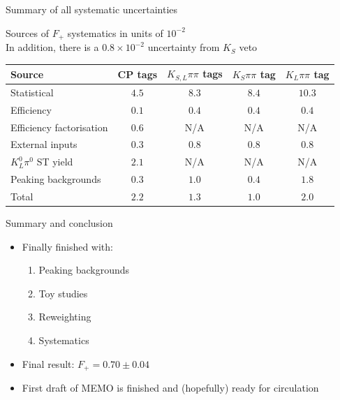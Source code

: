 \documentclass{beamer}
\begin{document}
\begin{frame}{Summary of all systematic uncertainties}
  \vspace{-0.3cm}
  \begin{center}
    Sources of $F_+$ systematics in units of $10^{-2}$ \\
    In addition, there is a $0.8\times 10^{-2}$ uncertainty from $K_S$ veto
  \end{center}
  \vspace{0.02cm}
  \begin{tabular}{lcccc} 
        \hline
        Source                   & CP tags                  & $K_{S, L}\pi\pi$ tags    & $K_S\pi\pi$ tag          & $K_L\pi\pi$ tag          \\
        \hline
        Statistical              & $4.5$                    & $8.3$                    & $8.4$                    & $10.3$                   \\
        \hline
        Efficiency               & $0.1$                    & $0.4$                    & $0.4$                    & $0.4$                    \\
        Efficiency factorisation & $0.6$                    & N/A                      & N/A                      & N/A                      \\
        External inputs          & $0.3$                    & $0.8$                    & $0.8$                    & $0.8$                    \\
        $K^0_L\pi^0$ ST yield    & $2.1$                    & N/A                      & N/A                      & N/A                      \\
        Peaking backgrounds      & $0.3$                    & $1.0$                    & $0.4$                    & $1.8$                    \\
        \hline
        Total                    & $2.2$                    & $1.3$                    & $1.0$                    & $2.0$                    \\
        \hline
  \end{tabular}
\end{frame}

\begin{frame}{Summary and conclusion}
  \begin{itemize}
    \setlength\itemsep{2.0em}
    \item{Finally finished with:}
    \begin{enumerate}
      \item{Peaking backgrounds}
      \item{Toy studies}
      \item{Reweighting}
      \item{Systematics}
    \end{enumerate}
    \item{Final result: $F_+ = 0.70 \pm 0.04$}
    \item{First draft of MEMO is finished and (hopefully) ready for circulation}
  \end{itemize}
\end{frame}
\end{document}
